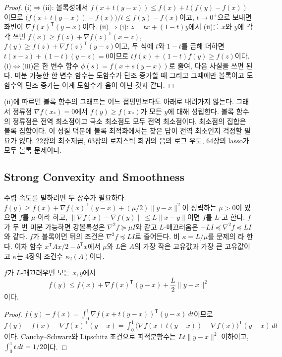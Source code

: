 \begin{proof}
(i)$\Rightarrow$(ii): 볼록성에서 $f(x+t(y-x))\le f(x)+t(f(y)-f(x))$이므로 $\bigl(f(x+t(y-x))-f(x)\bigr)/t\le f(y)-f(x)$이고, $t\to0^+$으로 보내면 좌변이 $\nabla f(x)^{\mathsf T}(y-x)$이다. (ii)$\Rightarrow$(i): $z=tx+(1-t)y$에서 (ii)를 $x$와 $y$에 각각 쓰면 $f(x)\ge f(z)+\nabla f(z)^{\mathsf T}(x-z)$, $f(y)\ge f(z)+\nabla f(z)^{\mathsf T}(y-z)$이고, 두 식에 $t$와 $1-t$를 곱해 더하면 $t(x-z)+(1-t)(y-z)=0$이므로 $tf(x)+(1-t)f(y)\ge f(z)$이다. (i)$\Leftrightarrow$(iii)은 한 변수 함수 $\phi(s)=f(x+s(y-x))$로 줄여, 다음 사실을 쓰면 된다. 미분 가능한 한 변수 함수는 도함수가 단조 증가할 때 그리고 그때에만 볼록이고 도함수의 단조 증가는 이계 도함수가 음이 아닌 것과 같다.
\end{proof}

(ii)에 따르면 볼록 함수의 그래프는 어느 접평면보다도 아래로 내려가지 않는다. 그래서 정류점 $\nabla f(x_\ast)=0$에서 $f(y)\ge f(x_\ast)$가 모든 $y$에 대해 성립한다. 볼록 함수의 정류점은 전역 최소점이고 국소 최소점도 모두 전역 최소점이다. 최소점의 집합은 볼록 집합이다. 이 성질 덕분에 볼록 최적화에서는 찾은 답이 전역 최소인지 걱정할 필요가 없다. 22장의 최소제곱, 63장의 로지스틱 회귀의 음의 로그 우도, 64장의 lasso가 모두 볼록 문제이다.

\subsection{Strong Convexity and Smoothness}

수렴 속도를 말하려면 두 상수가 필요하다. $f(y)\ge f(x)+\nabla f(x)^{\mathsf T}(y-x)+(\mu/2)\|y-x\|^2$이 성립하는 $\mu>0$이 있으면 $f$를 $\mu$-이라 하고, $\|\nabla f(x)-\nabla f(y)\|\le L\|x-y\|$이면 $f$를 $L$-고 한다. $f$가 두 번 미분 가능하면 강볼록성은 $\nabla^2f\succeq\mu I$와 같고 $L$-매끄러움은 $-LI\preceq\nabla^2f\preceq LI$와 같다. $f$가 볼록이면 뒤의 조건은 $\nabla^2f\preceq LI$로 줄어든다. 비 $\kappa=L/\mu$를 문제의 라 한다. 이차 함수 $x^{\mathsf T}Ax/2-b^{\mathsf T}x$에서 $\mu$와 $L$은 $A$의 가장 작은 고유값과 가장 큰 고유값이고 $\kappa$는 4장의 조건수 $\kappa_2(A)$이다.

\begin{proposition}[하강 보조정리]
\label{prop:descent-lemma}
$f$가 $L$-매끄러우면 모든 $x,y$에서
\[
f(y)\le f(x)+\nabla f(x)^{\mathsf T}(y-x)+\frac L2\|y-x\|^2
\]
이다.
\end{proposition}

\begin{proof}
$f(y)-f(x)=\int_0^1\nabla f(x+t(y-x))^{\mathsf T}(y-x)\,dt$이므로 $f(y)-f(x)-\nabla f(x)^{\mathsf T}(y-x)=\int_0^1\bigl(\nabla f(x+t(y-x))-\nabla f(x)\bigr)^{\mathsf T}(y-x)\,dt$이다. Cauchy--Schwarz와 Lipschitz 조건으로 피적분함수는 $Lt\|y-x\|^2$ 이하이고, $\int_0^1t\,dt=1/2$이다.
\end{proof}

